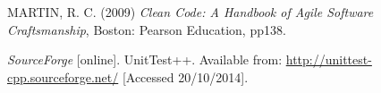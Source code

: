 \documentclass[12pt,a4paper]{article}
\begin{document}
\maketitle
\newpage


\tableofcontents
\newpage

















\begin{thebibliography}{100}

     MARTIN, R. C. (2009) {\em Clean Code: A Handbook of Agile Software Craftsmanship}, Boston: Pearson Education, pp138.
   
    {\em SourceForge} [online]. UnitTest++. Available from: \url{http://unittest-cpp.sourceforge.net/} [Accessed 20/10/2014].

\end{thebibliography}
\end{document}

